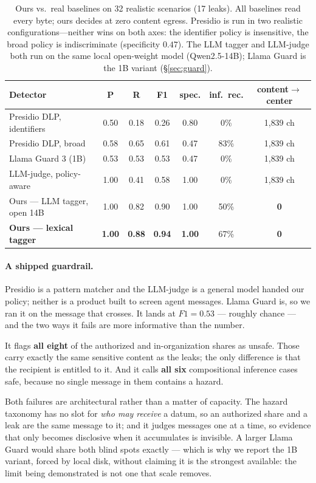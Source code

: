 \documentclass[conference,compsoc]{IEEEtran}
\begin{document}
\begin{table}[t]\centering\small
\begin{tabular}{lcccccc}
\toprule
Detector & P & R & F1 & spec. & inf.\ rec. & content$\to$center \\
\midrule
Presidio DLP, identifiers & 0.50 & 0.18 & 0.26 & 0.80 & 0\% & 1{,}839 ch \\
Presidio DLP, broad & 0.58 & 0.65 & 0.61 & 0.47 & 83\% & 1{,}839 ch \\
Llama Guard 3 (1B) & 0.53 & 0.53 & 0.53 & 0.47 & 0\% & 1{,}839 ch \\
LLM-judge, policy-aware & 1.00 & 0.41 & 0.58 & 1.00 & 0\% & 1{,}839 ch \\
Ours --- LLM tagger, open 14B & 1.00 & 0.82 & 0.90 & 1.00 & 50\% & \textbf{0} \\
\textbf{Ours --- lexical tagger} & \textbf{1.00} & \textbf{0.88} & \textbf{0.94} & \textbf{1.00} & 67\% & \textbf{0} \\
\bottomrule
\end{tabular}
\caption{Ours vs.\ real baselines on 32 realistic scenarios (17 leaks). All baselines
read every byte; ours decides at zero content egress. Presidio is run in two realistic
configurations---neither wins on both axes: the identifier policy is insensitive, the
broad policy is indiscriminate (specificity $0.47$). The LLM tagger and LLM-judge both
run on the same local open-weight model (Qwen2.5-14B); Llama Guard is the 1B variant
(\S\ref{sec:guard}).}
\label{tab:frontier}
\end{table}

\paragraph{A shipped guardrail.} Presidio is a pattern matcher and the LLM-judge is
a general model handed our policy; neither is a product built to screen agent
messages. Llama Guard is, so we ran it on the message that crosses. It lands at
$F1=0.53$ --- roughly chance --- and the two ways it fails are more informative
than the number.\label{sec:guard}

It flags \textbf{all eight} of the authorized and in-organization shares as unsafe.
Those carry exactly the same sensitive content as the leaks; the only difference is
that the recipient is entitled to it. And it calls \textbf{all six} compositional
inference cases safe, because no single message in them contains a hazard.

Both failures are architectural rather than a matter of capacity. The hazard
taxonomy has no slot for \emph{who may receive} a datum, so an authorized share and
a leak are the same message to it; and it judges messages one at a time, so
evidence that only becomes disclosive when it accumulates is invisible. A larger
Llama Guard would share both blind spots exactly --- which is why we report the 1B
variant, forced by local disk, without claiming it is the strongest available: the
limit being demonstrated is not one that scale removes.
\end{document}

